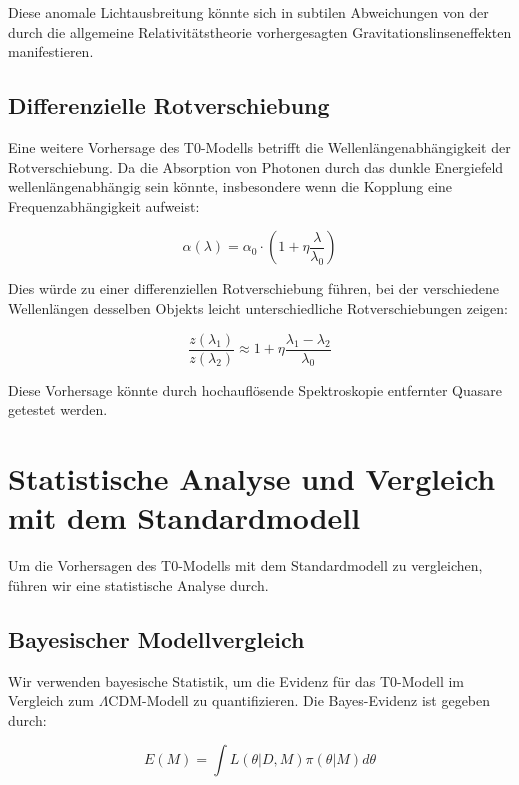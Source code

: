 \documentclass[a4paper,12pt]{article}
\begin{document}
Diese anomale Lichtausbreitung könnte sich in subtilen Abweichungen von der durch die allgemeine Relativitätstheorie vorhergesagten Gravitationslinseneffekten manifestieren.

\subsection{Differenzielle Rotverschiebung}

Eine weitere Vorhersage des T0-Modells betrifft die Wellenlängenabhängigkeit der Rotverschiebung. Da die Absorption von Photonen durch das dunkle Energiefeld wellenlängenabhängig sein könnte, insbesondere wenn die Kopplung eine Frequenzabhängigkeit aufweist:

\begin{equation}
	\alpha(\lambda) = \alpha_0 \cdot \left(1 + \eta\frac{\lambda}{\lambda_0}\right)
\end{equation}

Dies würde zu einer differenziellen Rotverschiebung führen, bei der verschiedene Wellenlängen desselben Objekts leicht unterschiedliche Rotverschiebungen zeigen:

\begin{equation}
	\frac{z(\lambda_1)}{z(\lambda_2)} \approx 1 + \eta\frac{\lambda_1 - \lambda_2}{\lambda_0}
\end{equation}

Diese Vorhersage könnte durch hochauflösende Spektroskopie entfernter Quasare getestet werden.

\section{Statistische Analyse und Vergleich mit dem Standardmodell}

Um die Vorhersagen des T0-Modells mit dem Standardmodell zu vergleichen, führen wir eine statistische Analyse durch.

\subsection{Bayesischer Modellvergleich}

Wir verwenden bayesische Statistik, um die Evidenz für das T0-Modell im Vergleich zum $\Lambda$CDM-Modell zu quantifizieren. Die Bayes-Evidenz ist gegeben durch:

\begin{equation}
	E(M) = \int L(\theta|D,M) \pi(\theta|M) d\theta
\end{equation}
\end{document}
